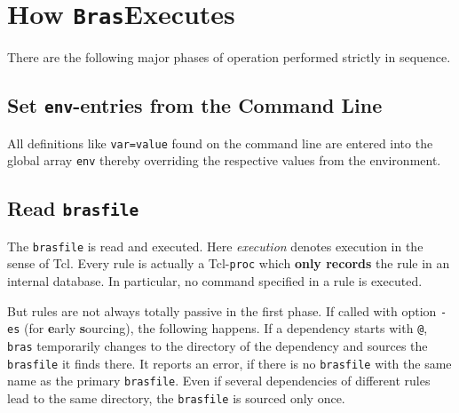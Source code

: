 \documentclass[12pt]{article}
\newcommand{\bras}{\texttt{bras}}
\newcommand{\Bras}{\texttt{Bras}}
\begin{document}
\section{How \Bras Executes}

There are the following major phases of operation performed strictly in
sequence.

\subsection{Set \texttt{env}-entries from the Command Line}
\label{secEnv}
All definitions like \texttt{var=value} found on the command
line are entered into the global array \texttt{env} thereby
overriding the respective values from the environment.



\subsection{Read \texttt{brasfile}}

The \texttt{brasfile} is read and executed. Here \textit{execution}
denotes execution in the sense of Tcl. Every rule is actually a
Tcl-\texttt{proc} which \textbf{only records} the rule in an internal
database. In particular, no command specified in a rule is executed.

But rules are not always totally passive in the first phase.  If
called with option \texttt{-es} (for \textbf{e}arly
\textbf{s}ourcing), the following happens.  If a dependency starts
with \texttt{@}, \bras{} temporarily changes to the directory of the
dependency and sources the \texttt{brasfile} it finds there. It
reports an error, if there is no \texttt{brasfile} with the same name
as the primary \texttt{brasfile}. Even if several dependencies of
different rules lead to the same directory, the \texttt{brasfile} is
sourced only once.
\end{document}
